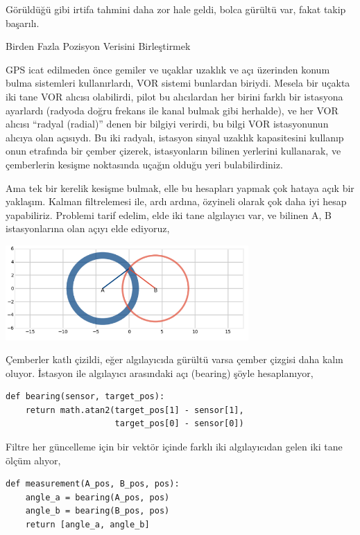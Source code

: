 \documentclass[12pt,fleqn]{article}\usepackage{../../common}
\begin{document}
Görüldüğü gibi irtifa tahmini daha zor hale geldi, bolca gürültü var, fakat
takip başarılı. 

Birden Fazla Pozisyon Verisini Birleştirmek 

GPS icat edilmeden önce gemiler ve uçaklar uzaklık ve açı üzerinden konum
bulma sistemleri kullanırlardı, VOR sistemi bunlardan biriydi. Mesela bir
uçakta iki tane VOR alıcısı olabilirdi, pilot bu alıcılardan her birini
farklı bir istasyona ayarlardı (radyoda doğru frekans ile kanal bulmak gibi
herhalde), ve her VOR alıcısı ``radyal (radial)'' denen bir bilgiyi
verirdi, bu bilgi VOR istasyonunun alıcıya olan açısıydı. Bu iki radyalı,
istasyon sinyal uzaklık kapasitesini kullanıp onun etrafında bir çember
çizerek, istasyonların bilinen yerlerini kullanarak, ve çemberlerin kesişme
noktasında uçağın olduğu yeri bulabilirdiniz. 

Ama tek bir kerelik kesişme bulmak, elle bu hesapları yapmak çok hataya
açık bir yaklaşım. Kalman filtrelemesi ile, ardı ardına, özyineli olarak
çok daha iyi hesap yapabiliriz. Problemi tarif edelim, elde iki tane
algılayıcı var, ve bilinen A, B istasyonlarına olan açıyı elde ediyoruz,

\includegraphics[width=25em]{tser_ukf_09.png}

Çemberler katlı çizildi, eğer algılayıcıda gürültü varsa çember çizgisi
daha kalın oluyor. İstasyon ile algılayıcı arasındaki açı (bearing) şöyle
hesaplanıyor,

\begin{verbatim}
def bearing(sensor, target_pos):
    return math.atan2(target_pos[1] - sensor[1], 
                      target_pos[0] - sensor[0])

\end{verbatim}

Filtre her güncelleme için bir vektör içinde farklı iki algılayıcıdan gelen
iki tane ölçüm alıyor,

\begin{verbatim}
def measurement(A_pos, B_pos, pos):
    angle_a = bearing(A_pos, pos)
    angle_b = bearing(B_pos, pos)
    return [angle_a, angle_b]
\end{verbatim}
\end{document}
